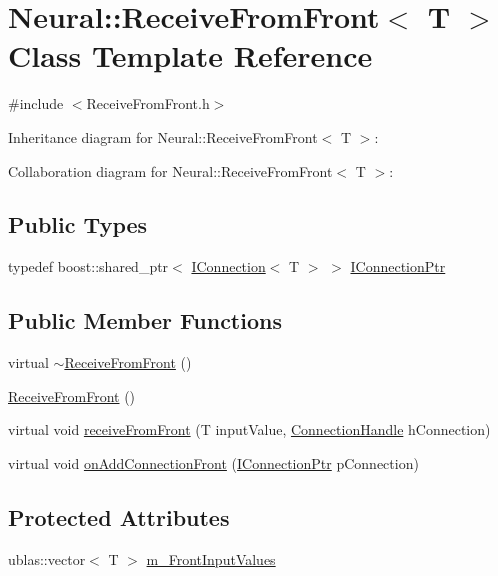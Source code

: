 \hypertarget{class_neural_1_1_receive_from_front}{
\section{Neural::ReceiveFromFront$<$ T $>$ Class Template Reference}
\label{class_neural_1_1_receive_from_front}
}


{\ttfamily \#include $<$ReceiveFromFront.h$>$}



Inheritance diagram for Neural::ReceiveFromFront$<$ T $>$:


Collaboration diagram for Neural::ReceiveFromFront$<$ T $>$:
\subsection*{Public Types}
\begin{DoxyCompactItemize}
\item 
typedef boost::shared\_\-ptr$<$ \hyperlink{class_neural_1_1_i_connection}{IConnection}$<$ T $>$ $>$ \hyperlink{class_neural_1_1_receive_from_front_abf496040ce9745e7e1fc8274f9492295}{IConnectionPtr}
\end{DoxyCompactItemize}
\subsection*{Public Member Functions}
\begin{DoxyCompactItemize}
\item 
virtual \hyperlink{class_neural_1_1_receive_from_front_ac1ca99cfa27547074ff55d6c9d12f987}{$\sim$ReceiveFromFront} ()
\item 
\hyperlink{class_neural_1_1_receive_from_front_abbb4a0c6b78b7c79caa6c93c753a8849}{ReceiveFromFront} ()
\item 
virtual void \hyperlink{class_neural_1_1_receive_from_front_aa460db39ebf7cb6858ce070e9f988174}{receiveFromFront} (T inputValue, \hyperlink{namespace_neural_a73b2763d14999ad4308dbf4246aa503f}{ConnectionHandle} hConnection)
\item 
virtual void \hyperlink{class_neural_1_1_receive_from_front_a7ca8c38ebf9cc2af3cdd04d9e6e20055}{onAddConnectionFront} (\hyperlink{class_neural_1_1_i_node_a5243be0a422bcddc5a71a79920d09fd1}{IConnectionPtr} pConnection)
\end{DoxyCompactItemize}
\subsection*{Protected Attributes}
\begin{DoxyCompactItemize}
\item 
ublas::vector$<$ T $>$ \hyperlink{class_neural_1_1_receive_from_front_a790fab8f7b2e277153de09ce3fe93d94}{m\_\-FrontInputValues}
\end{DoxyCompactItemize}


